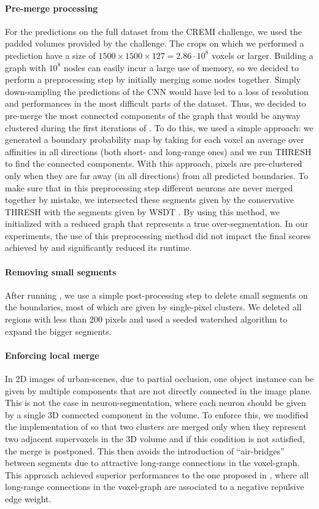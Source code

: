  \paragraph{Pre-merge processing} For the predictions on the full dataset from the CREMI challenge, we used  the padded volumes provided by the challenge. The crops on which we performed a prediction have a size of $1500\times1500\times127=2.86\cdot 10^8$ voxels or larger. Building a graph with $10^8$ nodes can easily incur a large use of memory, so we decided to perform a preprocessing step by initially merging some nodes together. Simply down-sampling the predictions of the CNN would have led to a loss of resolution and performances in the most difficult parts of the dataset. Thus, we decided to pre-merge the most connected components of the graph that would be anyway clustered during the first iterations of \algname{}. To do this, we used a simple approach: we generated a boundary probability map by taking for each voxel an average over affinities in all directions (both short- and long-range ones) and we run THRESH to find the connected components. With this approach, pixels are pre-clustered only when they are far away (in all directions) from all predicted boundaries. 
 To make sure that in this preprocessing step different neurons are never merged together by mistake, we intersected these segments given by the conservative THRESH with the segments given by WSDT . By using this method, we initialized \algname{} with a reduced graph that represents a true over-segmentation. In our experiments, the use of this preprocessing method did not impact the final scores achieved by \algname{} and significantly reduced its runtime.
 
 \paragraph{Removing small segments} After running \algname{}, we use a simple post-processing step to delete small segments on the boundaries, most of which are given by single-pixel clusters. We deleted all regions with less than 200 pixels and used a seeded watershed algorithm to expand the bigger segments.

 \paragraph{Enforcing local merge} In 2D images of urban-scenes, due to partial occlusion, one object instance can be given by multiple components that are not directly connected in the image plane. This is not the case in neuron-segmentation, where each neuron should be given by a single 3D connected component in the volume. To enforce this, we modified the implementation of \algname{} so that two clusters are merged only when they represent two adjacent supervoxels in the 3D volume and if this condition is not satisfied, the merge is postponed. This then avoids the introduction of ``air-bridges'' between segments due to attractive long-range connections in the voxel-graph.
 This approach achieved superior performances to the one proposed in \cite{wolf2018mutex}, where all long-range connections in the voxel-graph are associated to a negative repulsive edge weight.

